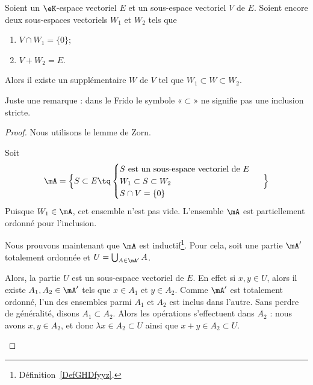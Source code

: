 \begin{lemma}        \label{LEMooSSRXooIyfgNz}
	Soient un \( \eK\)-espace vectoriel \( E\) et un sous-espace vectoriel \( V\) de \( E\). Soient encore deux sous-espaces vectoriels \( W_1\) et \( W_2\) tels que
	\begin{enumerate}
		\item
		      \( V\cap W_1=\{ 0 \}\);
		\item
		      \( V+W_2=E\).
	\end{enumerate}
	Alors il existe un supplémentaire \( W\) de \( V\) tel que \( W_1\subset W\subset W_2\).
\end{lemma}

Juste une remarque : dans le Frido le symbole «\( \subset\)» ne signifie pas une inclusion stricte.

\begin{proof}
	Nous utilisons le lemme de Zorn.
	\begin{subproof}
		Soit
		\begin{equation}
			\mA=\Big\{   S\subset E\tq \begin{cases}
				S    \text{ est un sous-espace vectoriel de \( E\) } \\
				W_1\subset S\subset W_2                              \\
				S\cap V=\{ 0 \}
			\end{cases}\Big\}
		\end{equation}
		Puisque \( W_1\in \mA\), cet ensemble n'est pas vide.
		\spitem[Ordre]
		L'ensemble \( \mA\) est partiellement ordonné pour l'inclusion.

		Nous prouvons maintenant que \( \mA\) est inductif\footnote{Définition~\ref{DefGHDfyyz}.}. Pour cela, soit une partie \( \mA'\) totalement ordonnée et \( U=\bigcup_{A\in \mA'}A\).

		Alors, la partie \( U\) est un sous-espace vectoriel de \( E\). En effet si \( x,y\in U\), alors il existe \( A_1,A_2\in\mA'\) tels que \( x\in A_1\) et \( y\in A_2\). Comme \( \mA'\) est totalement ordonné, l'un des ensembles parmi \( A_1\) et \( A_2\) est inclus dans l'autre. Sans perdre de généralité, disons \( A_1\subset A_2\). Alors les opérations s'effectuent dans \( A_2 \) : nous avons \( x,y\in A_2\), et donc \( \lambda x\in A_2\subset U\) ainsi que \( x+y\in A_2\subset U\).


\end{subproof}
\end{proof}
